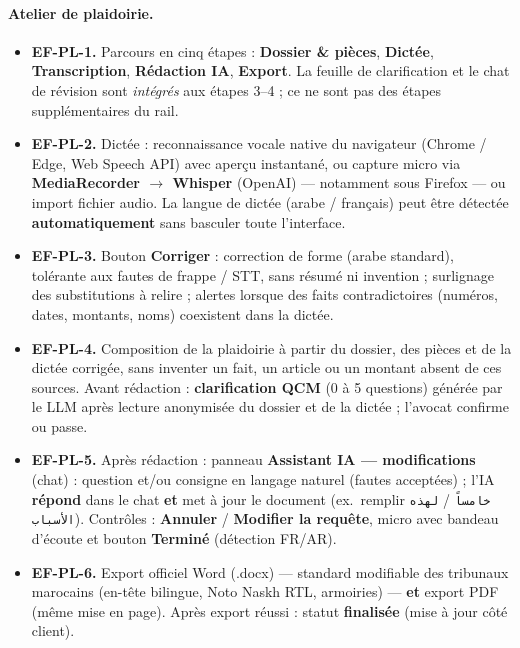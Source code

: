 \paragraph{Atelier de plaidoirie.}
\begin{itemize}[leftmargin=1.4em]
  \item \textbf{EF-PL-1.} Parcours en cinq étapes : \textbf{Dossier \& pièces}, \textbf{Dictée}, \textbf{Transcription}, \textbf{Rédaction IA}, \textbf{Export}. La feuille de clarification et le chat de révision sont \emph{intégrés} aux étapes 3--4 ; ce ne sont pas des étapes supplémentaires du rail.
  \item \textbf{EF-PL-2.} Dictée : reconnaissance vocale native du navigateur (Chrome / Edge, Web Speech API) avec aperçu instantané, ou capture micro via \textbf{MediaRecorder $\rightarrow$ Whisper} (OpenAI) --- notamment sous Firefox --- ou import fichier audio. La langue de dictée (arabe / français) peut être détectée \textbf{automatiquement} sans basculer toute l'interface.
  \item \textbf{EF-PL-3.} Bouton \textbf{Corriger} : correction de forme (arabe standard), tolérante aux fautes de frappe / STT, sans résumé ni invention ; surlignage des substitutions à relire ; alertes lorsque des faits contradictoires (numéros, dates, montants, noms) coexistent dans la dictée.
  \item \textbf{EF-PL-4.} Composition de la plaidoirie à partir du dossier, des pièces et de la dictée corrigée, sans inventer un fait, un article ou un montant absent de ces sources. Avant rédaction : \textbf{clarification QCM} (0 à 5 questions) générée par le LLM après lecture anonymisée du dossier et de la dictée ; l'avocat confirme ou passe.
  \item \textbf{EF-PL-5.} Après rédaction : panneau \textbf{Assistant IA --- modifications} (chat) : question et/ou consigne en langage naturel (fautes acceptées) ; l'IA \textbf{répond} dans le chat \textbf{et} met à jour le document (ex.\ remplir \texttt{خامساً} / \texttt{لهذه الأسباب}). Contrôles : \textbf{Annuler} / \textbf{Modifier la requête}, micro avec bandeau d'écoute et bouton \textbf{Terminé} (détection FR/AR).
  \item \textbf{EF-PL-6.} Export officiel Word (.docx) --- standard modifiable des tribunaux marocains (en-tête bilingue, Noto Naskh RTL, armoiries) --- \textbf{et} export PDF (même mise en page). Après export réussi : statut \textbf{finalisée} (mise à jour côté client).
\end{itemize}

